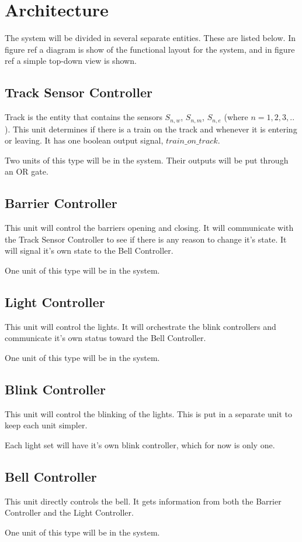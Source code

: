 \documentclass[final]{report}
\begin{document}
\chapter{Architecture}
The system will be divided in several separate entities.
These are listed below.
In figure ref{} a diagram is show of the functional layout for the system, and in figure ref{} a simple top-down view is shown.

\section{Track Sensor Controller}
Track is the entity that contains the sensors $S_{n,w}$, $S_{n,m}$, $S_{n,e}$ (where $n = 1,2,3,..$).
This unit determines if there is a train on the track and whenever it is entering or leaving.
It has one boolean output signal, $train\_on\_track$.

Two units of this type will be in the system.
Their outputs will be put through an OR gate.

\section{Barrier Controller}
This unit will control the barriers opening and closing.
It will communicate with the Track Sensor Controller to see if there is any reason to change it's state.
It will signal it's own state to the Bell Controller.

One unit of this type will be in the system.

\section{Light Controller}
This unit will control the lights.
It will orchestrate the blink controllers and communicate it's own status toward the Bell Controller.

One unit of this type will be in the system.

\section{Blink Controller}
This unit will control the blinking of the lights.
This is put in a separate unit to keep each unit simpler.

Each light set will have it's own blink controller, which for now is only one.

\section{Bell Controller}
This unit directly controls the bell.
It gets information from both the Barrier Controller and the Light Controller.

One unit of this type will be in the system.
\end{document}
